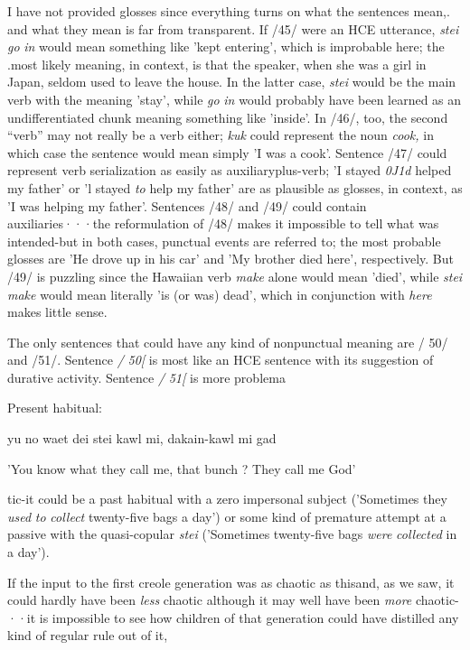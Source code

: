 I have not provided glosses since everything turns on what the sentences mean,. and what they mean is far from transparent. If /45/ were an HCE utterance, \textit{stei} \textit{go} \textit{in} would mean something like 'kept entering',
which is improbable here; the .most likely meaning, in context, is that the speaker, when she was a girl in Japan, seldom used to leave the house. In the latter case, \textit{stei} would be the main verb with the meaning
'stay', while \textit{go} \textit{in} would probably have been learned as an undifferenti\-ated chunk meaning something like 'inside'. In /46/, too, the second ``verb'' may not really be a verb either; \textit{kuk} could represent the noun \textit{cook,} in which case the sentence would mean simply 'I was a cook'. Sentence /47/ could represent verb serialization as easily as auxiliary\-plus-verb; 'I stayed \textit{0J1d} helped my father' or 'l stayed \textit{to} help my father' are as plausible as glosses, in context, as 'I was helping my father'. Sentences /48/ and /49/ could contain auxiliaries···the reformu\-lation of /48/ makes it impossible to tell what was intended-but in both cases, punctual events are referred to; the most probable glosses are 'He drove up in his car' and 'My brother died here', respectively. But /49/ is puzzling since the Hawaiian verb \textit{make} alone would mean 'died', while \textit{stei} \textit{make} would mean literally 'is (or was) dead', which in conjunction with \textit{here} makes little sense.

The only sentences that could have any kind of nonpunctual meaning are / 50/ and /51/. Sentence \textit{/} \textit{50[} is most like an HCE sentence with its suggestion of durative activity. Sentence \textit{/} \textit{51[} is more problema\-


\ea\label{ex:54}
 Present habitual:
\glt
\z

yu no waet dei stei kawl mi, dakain-kawl mi gad

'You know what they call me, that bunch ? They call me God'

tic-it could be a past habitual with a zero impersonal subject ('Some\-times they \textit{used} \textit{to} \textit{collect} twenty-five bags a day') or some kind of premature attempt at a passive with the quasi-copular \textit{stei} ('Sometimes twenty-five bags \textit{were} \textit{collected} in a day').

If the input to the first creole generation was as chaotic as this\-and, as we saw, it could hardly have been \textit{less} chaotic although it may well have been \textit{more} chaotic-··it is impossible to see how children of that generation could have distilled any kind of regular rule out of it,

